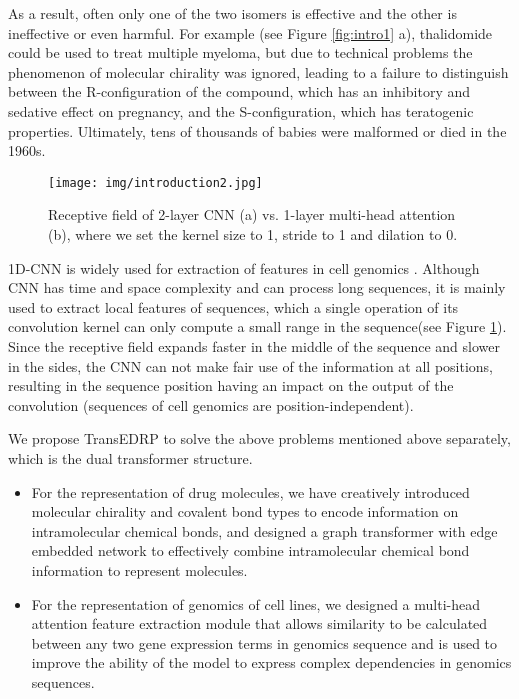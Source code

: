 \documentclass{article}
\begin{document}
As a result, often only one of the two isomers is effective and the other is ineffective or even harmful. For example (see Figure \ref{fig:intro1} a), thalidomide could be used to treat multiple myeloma, but due to technical problems the phenomenon of molecular chirality was ignored, leading to a failure to distinguish between the R-configuration of the compound, which has an inhibitory and sedative effect on pregnancy, and the S-configuration, which has teratogenic properties. Ultimately, tens of thousands of babies were malformed or died in the 1960s.



\begin{figure}[htbp]
    \centering
	\texttt{[image: img/introduction2.jpg]}
	\caption{Receptive field of 2-layer CNN (a) vs. 1-layer multi-head attention (b), where we set the kernel size to 1, stride to 1 and dilation to 0.}
	\label{fig:intro2}
\end{figure}







1D-CNN is widely used for extraction of features in cell genomics  \cite{tcnns,110bGCNforDRP,DeepCDR,GraTransDRP,GraphDTA}.
Although CNN has  time and space complexity and can process long sequences, it is mainly used to extract local features of sequences, which a single operation of its convolution kernel can only compute a small range in the sequence(see Figure \ref{fig:intro2}). 
Since the receptive field expands faster in the middle of the sequence and slower in the sides, the CNN can not make fair use of the information at all positions, resulting in the sequence position having an impact on the output of the convolution (sequences  of cell genomics  are position-independent).








 We propose TransEDRP  to solve the above problems mentioned above separately, which is the dual transformer structure.



\begin{itemize}
  \item [1)] 
For the representation of drug molecules, we have creatively introduced molecular chirality and covalent bond types to encode information on intramolecular chemical bonds, and designed a graph transformer with edge embedded network to effectively combine intramolecular chemical bond information to represent molecules.
  \item [2)] 
For the representation of genomics of cell lines, we designed a multi-head attention feature extraction module  that allows similarity to be calculated between any two gene expression terms in genomics sequence and is used to improve the ability of the model to express complex dependencies in genomics sequences.
\end{itemize}
\end{document}
